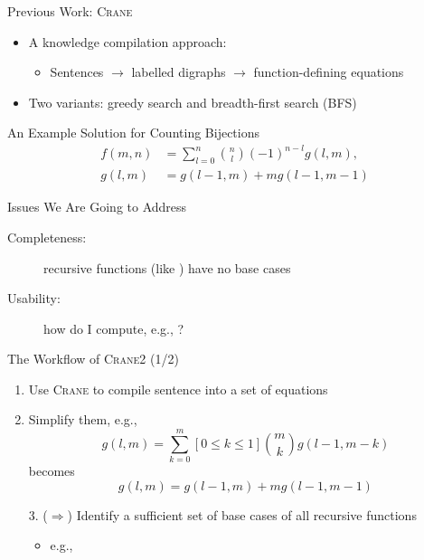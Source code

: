 \documentclass{beamer}
\begin{document}
\begin{frame}{Previous Work:
    \textsc{Crane}~\textcolor{gray}{\parencite{DBLP:conf/kr/DilkasB23}}}
  \begin{itemize}
    \item A knowledge compilation approach:
          \begin{itemize}
            \item \alert{Sentences} $\to$ labelled \alert{digraphs} $\to$
                  function-defining \alert{equations}
          \end{itemize}
    \item Two variants: \alert{greedy} search and \alert{breadth-first} search
          (BFS)
  \end{itemize}
  \pause
  \begin{exampleblock}{An Example Solution for Counting Bijections}
    \begin{align*}
      f(m, n) &= \sum_{l=0}^{n} \binom{n}{l}{(-1)}^{n-l}g(l, m),\\
      g(l, m) &= g(l-1, m) + mg(l-1, m-1)
    \end{align*}
  \end{exampleblock}
  \pause
  \begin{alertblock}{Issues We Are Going to Address}
    \begin{description}
      \item[Completeness:] recursive functions (like ) have
            \alert{no base cases}
      \item[Usability:] how do I compute, e.g., ?
    \end{description}
  \end{alertblock}
\end{frame}

\begin{frame}{The Workflow of \textsc{Crane2} (1/2)}
  \begin{enumerate}
    \item Use \alert{\textsc{Crane}} to compile sentence \structure{$\phi$} into
          a set of equations  \pause
    \item Simplify them, e.g.,
          \[
            g(l, m) = \sum_{k=0}^{m}[0 \le k \le 1]\binom{m}{k}g(l-1, m-k)
          \]
          becomes
          \[
            g(l, m) = g(l-1, m) + mg(l-1, m-1)
          \] \pause
    \item[3. ($\Rightarrow$)] Identify a \alert{sufficient set of base cases} of
          all recursive functions
          \begin{itemize}
            \item e.g., 
          \end{itemize}
  \end{enumerate}
\end{frame}
\end{document}
